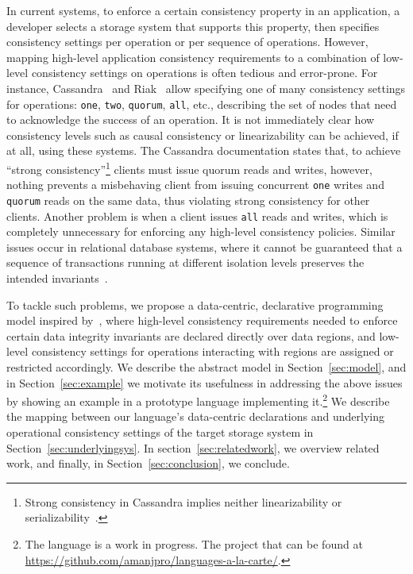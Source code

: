 \documentclass[numbers]{sigplanconf}
\begin{document}
In current systems, to enforce a certain consistency
property in an application, a developer selects a storage system that
supports this property, then specifies consistency settings per
operation or per sequence of operations. However, mapping high-level 
application consistency requirements to a combination of
low-level consistency settings on operations is often tedious and error-prone.
For instance, Cassandra~\cite{lakshman2010cassandra} and Riak~\cite{riak} allow 
specifying one of many consistency settings for operations:
\texttt{one}, \texttt{two}, \texttt{quorum}, \texttt{all}, etc., describing
the set of nodes that need to acknowledge the success of an operation. It
is not immediately clear how consistency levels such as causal consistency or
linearizability can be achieved, if at all, using these systems. The Cassandra documentation
states that, to achieve ``strong consistency''\footnote{Strong consistency in
Cassandra implies
neither linearizability or serializability~\cite{sivaramakrishnan2016representation}.} clients must issue quorum reads and writes,
however, nothing prevents a misbehaving client from issuing concurrent \texttt{one} writes and
\texttt{quorum} reads on the same data, thus violating strong consistency for other clients. Another
problem is when a client issues \texttt{all} reads and writes, which is completely
unnecessary for enforcing any high-level consistency policies. Similar issues
occur in relational database systems, where it cannot be guaranteed that a
sequence of transactions running at different isolation levels preserves the intended
invariants~\cite{gray1992transaction}. 

To tackle such problems, we propose a data-centric, declarative programming
model inspired by~\cite{dolby2012data}, where high-level consistency
requirements needed to enforce certain data integrity invariants 
are declared directly over data regions, and low-level 
consistency settings for operations interacting with
regions are assigned or restricted accordingly. We
describe the abstract model in Section~\ref{sec:model}, and in
Section~\ref{sec:example} we motivate its usefulness in addressing the above 
issues by showing an example in a prototype language implementing
it.\footnote{The language is a work in progress. The project that can be found at
  \url{https://github.com/amanjpro/languages-a-la-carte/}.}
We describe the mapping between our language's data-centric declarations and 
underlying operational consistency settings of the target storage system in 
Section~\ref{sec:underlyingsys}.  In section~\ref{sec:relatedwork}, we overview 
related work, and finally, in Section~\ref{sec:conclusion}, we conclude.
\end{document}
